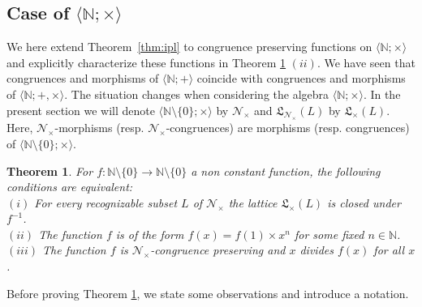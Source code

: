 \documentclass[11pt,a4paper]{article}
\newtheorem{theorem}{Theorem}[section]
\theoremstyle{definition} %
\newcommand\+[1]{\mathcal{#1}} %
\newcommand{\N}{{\mathbb N}}     %
\newcommand{\Latt}{{\mathfrak{L}}}
\begin{document}
\subsection{Case of  $\langle  \N ;\times\rangle$} \label{ss:Ntimes}
We here extend Theorem~\ref{thm:ipl}  to congruence preserving functions on $\langle  \N ;\times\rangle$  and  explicitly characterize these functions in Theorem \ref{thm:iplX} $(ii)$. We
have seen that congruences and morphisms of $\langle\N;+\rangle$ coincide with congruences and morphisms of $\langle\N;+,\times\rangle$. The situation changes  when considering
the algebra $\langle  \N ;\times\rangle$.  In the present section we will denote 
$\langle \N\setminus\!\{0\};\times\rangle$  by $\+N_\times$ and   $\Latt_{\+N_\times}(L)$ by $\Latt_\times(L)$.  Here, $\+N_\times$-morphisms (resp.\! $\+N_\times$-congruences) are morphisms (resp.\! congruences) of $\langle \N\setminus\!\{0\};\times\rangle$. 
%
\begin{theorem}\label{thm:iplX}
For $f:\N\setminus\{0\}\longrightarrow\N\setminus\{0\}$  a  non constant function, 
the following conditions are equivalent:\\
$(i)$ %
For every recognizable subset $L$ of $\+N_\times$ the lattice $\Latt_\times(L)$ is  closed under $f^{-1}$.\\
$(ii)$ %
The function  $f$ is  of the form 
$f(x)=f(1)\times x^n$ for some fixed  $n\in\N$.\\
$(iii)$ %
The function
$f$ is $\+N_\times$-congruence preserving and  $x$  divides $f(x)$ for all $x$. 
\end{theorem}
%
Before proving Theorem \ref{thm:iplX}, we  state  some observations and introduce a notation.
%
\end{document}
